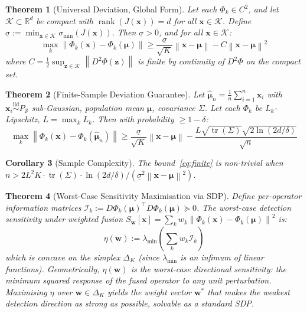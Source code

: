 \documentclass{article}
\newtheorem{theorem}{Theorem}
\newtheorem{corollary}[theorem]{Corollary}
\newcommand{\R}{\mathbb{R}}
\newcommand{\Nset}{\mathcal{S}}  %
\newcommand{\norm}[1]{\left\lVert#1\right\rVert}
\DeclareMathOperator{\tr}{tr}
\DeclareMathOperator{\rank}{rank}
\begin{document}
\begin{theorem}[Universal Deviation, Global Form]
\label{thm:global}
Let each $\Phi_k \in C^2$, and let $\mathcal{K} \subset \R^d$ be compact with $\rank(J(\mathbf{x})) = d$ for all $\mathbf{x} \in \mathcal{K}$. Define
$\underline{\sigma} := \min_{\mathbf{x} \in \mathcal{K}} \sigma_{\min}(J(\mathbf{x}))$.
Then $\underline{\sigma} > 0$, and for all $\mathbf{x} \in \mathcal{K}$:
\begin{equation}
\max_{k} \norm{\Phi_k(\mathbf{x}) - \Phi_k(\bm{\mu})} \geq \frac{\underline{\sigma}}{\sqrt{K}} \norm{\mathbf{x} - \bm{\mu}} - C\norm{\mathbf{x} - \bm{\mu}}^2
\label{eq:global}
\end{equation}
where $C = \frac{1}{2}\sup_{\mathbf{z} \in \mathcal{K}} \norm{D^2\Phi(\mathbf{z})}$ is finite by continuity of $D^2\Phi$ on the compact set.
\end{theorem}

\begin{theorem}[Finite-Sample Deviation Guarantee]
\label{thm:finite}
Let $\hat{\bm{\mu}}_n = \frac{1}{n}\sum_{i=1}^n \mathbf{x}_i$ with $\mathbf{x}_i \overset{\text{iid}}{\sim} P_\Nset$ sub-Gaussian, population mean $\bm{\mu}$, covariance $\Sigma$. Let each $\Phi_k$ be $L_k$-Lipschitz, $L = \max_k L_k$. Then with probability $\geq 1 - \delta$:
\begin{equation}
\max_{k} \norm{\Phi_k(\mathbf{x}) - \Phi_k(\hat{\bm{\mu}}_n)} \geq \frac{\underline{\sigma}}{\sqrt{K}}\norm{\mathbf{x} - \bm{\mu}} - \frac{L\sqrt{\tr(\Sigma)}\sqrt{2\ln(2d/\delta)}}{\sqrt{n}}
\label{eq:finite}
\end{equation}
\end{theorem}

\begin{corollary}[Sample Complexity]
\label{cor:sample}
The bound~\eqref{eq:finite} is non-trivial when $n > 2L^2 K \cdot \tr(\Sigma) \cdot \ln(2d/\delta) / (\underline{\sigma}^2 \norm{\mathbf{x}-\bm{\mu}}^2)$.
\end{corollary}

\begin{theorem}[Worst-Case Sensitivity Maximisation via SDP]
\label{thm:sdp}
Define per-operator information matrices $\mathcal{I}_k := D\Phi_k(\bm{\mu})^\top D\Phi_k(\bm{\mu}) \succeq 0$. The worst-case detection sensitivity under weighted fusion $S_\mathbf{w}[\mathbf{x}] = \sum_k w_k \norm{\Phi_k(\mathbf{x}) - \Phi_k(\bm{\mu})}^2$ is:
\begin{equation}
\eta(\mathbf{w}) := \lambda_{\min}\!\left(\textstyle\sum_k w_k \mathcal{I}_k\right)
\end{equation}
which is concave on the simplex $\Delta_K$ (since $\lambda_{\min}$ is an infimum of linear functions). Geometrically, $\eta(\mathbf{w})$ is the worst-case directional sensitivity: the minimum squared response of the fused operator to any unit perturbation. Maximising $\eta$ over $\mathbf{w} \in \Delta_K$ yields the weight vector $\mathbf{w}^*$ that makes the weakest detection direction as strong as possible, solvable as a standard SDP.
\end{theorem}
\end{document}

